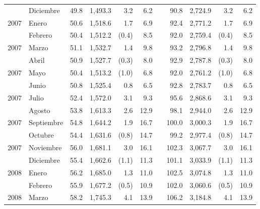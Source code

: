 \begin{center}
\begin{longtable}{llrrrrrrrrr}
		\rowcolor{color1!5!white}\multicolumn{1}{l}{	2006	}&	Diciembre	&	 49.8 	&	 1,493.3 	&	 3.2 	&	 6.2 	&  &	 90.8 	&	 2,724.9 	&	 3.2 	&	 6.2 	\\
		\multicolumn{1}{l}{	2007	}&	Enero	&	 50.6 	&	 1,518.6 	&	 1.7 	&	 6.9 	&  &	 92.4 	&	 2,771.2 	&	 1.7 	&	 6.9 	\\
		\rowcolor{color1!5!white}\multicolumn{1}{l}{	2007	}&	Febrero	&	 50.4 	&	 1,512.2 	&	 (0.4)	&	 8.5 	&  &	 92.0 	&	 2,759.4 	&	 (0.4)	&	 8.5 	\\
		\multicolumn{1}{l}{	2007	}&	Marzo	&	 51.1 	&	 1,532.7 	&	 1.4 	&	 9.8 	&  &	 93.2 	&	 2,796.8 	&	 1.4 	&	 9.8 	\\
		\rowcolor{color1!5!white}\multicolumn{1}{l}{	2007	}&	Abril	&	 50.9 	&	 1,527.7 	&	 (0.3)	&	 8.0 	&  &	 92.9 	&	 2,787.8 	&	 (0.3)	&	 8.0 	\\
		\multicolumn{1}{l}{	2007	}&	Mayo	&	 50.4 	&	 1,513.2 	&	 (1.0)	&	 6.8 	&  &	 92.0 	&	 2,761.2 	&	 (1.0)	&	 6.8 	\\
		\rowcolor{color1!5!white}\multicolumn{1}{l}{	2007	}&	Junio	&	 50.8 	&	 1,525.4 	&	 0.8 	&	 6.5 	&  &	 92.8 	&	 2,783.7 	&	 0.8 	&	 6.5 	\\
		\multicolumn{1}{l}{	2007	}&	Julio	&	 52.4 	&	 1,572.0 	&	 3.1 	&	 9.3 	&  &	 95.6 	&	 2,868.6 	&	 3.1 	&	 9.3 	\\
		\rowcolor{color1!5!white}\multicolumn{1}{l}{	2007	}&	Agosto	&	 53.8 	&	 1,613.3 	&	 2.6 	&	 12.9 	&  &	 98.1 	&	 2,944.0 	&	 2.6 	&	 12.9 	\\
		\multicolumn{1}{l}{	2007	}&	Septiembre	&	 54.8 	&	 1,644.2 	&	 1.9 	&	 16.7 	&  &	 100.0 	&	 3,000.3 	&	 1.9 	&	 16.7 	\\
		\rowcolor{color1!5!white}\multicolumn{1}{l}{	2007	}&	Octubre	&	 54.4 	&	 1,631.6 	&	 (0.8)	&	 14.7 	&  &	 99.2 	&	 2,977.4 	&	 (0.8)	&	 14.7 	\\
		\multicolumn{1}{l}{	2007	}&	Noviembre	&	 56.0 	&	 1,681.1 	&	 3.0 	&	 16.1 	&  &	 102.3 	&	 3,067.7 	&	 3.0 	&	 16.1 	\\
		\rowcolor{color1!5!white}\multicolumn{1}{l}{	2007	}&	Diciembre	&	 55.4 	&	 1,662.6 	&	 (1.1)	&	 11.3 	&  &	 101.1 	&	 3,033.9 	&	 (1.1)	&	 11.3 	\\
		\multicolumn{1}{l}{	2008	}&	Enero	&	 56.2 	&	 1,685.0 	&	 1.3 	&	 11.0 	&  &	 102.5 	&	 3,074.8 	&	 1.3 	&	 11.0 	\\
		\rowcolor{color1!5!white}\multicolumn{1}{l}{	2008	}&	Febrero	&	 55.9 	&	 1,677.2 	&	 (0.5)	&	 10.9 	&  &	 102.0 	&	 3,060.6 	&	 (0.5)	&	 10.9 	\\
		\multicolumn{1}{l}{	2008	}&	Marzo	&	 58.2 	&	 1,745.3 	&	 4.1 	&	 13.9 	&  &	 106.2 	&	 3,184.8 	&	 4.1 	&	 13.9 	\\

\end{longtable}
\end{center}
